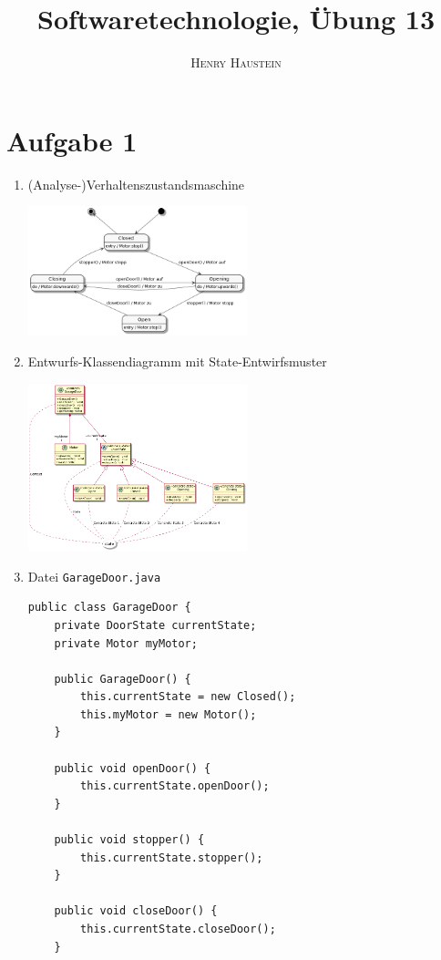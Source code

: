 \documentclass{article}
\title{\textbf{Softwaretechnologie, Übung 13}}
\author{\textsc{Henry Haustein}}
\date{}
\begin{document}
	\maketitle
	
	\section*{Aufgabe 1}
	\begin{enumerate}[label=(\alph*)]
		\item (Analyse-)Verhaltenszustandsmaschine
		\begin{center}
			\includegraphics[width=0.50\textwidth]{./Aufgabe13_1a}
		\end{center}
		\item Entwurfs-Klassendiagramm mit State-Entwirfsmuster
		\begin{center}
			\includegraphics[width=0.50\textwidth]{./Aufgabe13_1b}
		\end{center}
		\item Datei \texttt{GarageDoor.java}
		\begin{lstlisting}[style=java,tabsize=2]
public class GarageDoor {
	private DoorState currentState; 
	private Motor myMotor; 

	public GarageDoor() {
		this.currentState = new Closed();
		this.myMotor = new Motor();
	}

	public void openDoor() {
		this.currentState.openDoor();
	}

	public void stopper() {
		this.currentState.stopper();
	}

	public void closeDoor() {
		this.currentState.closeDoor();
	}


\end{lstlisting}
\end{enumerate}
\end{document}
